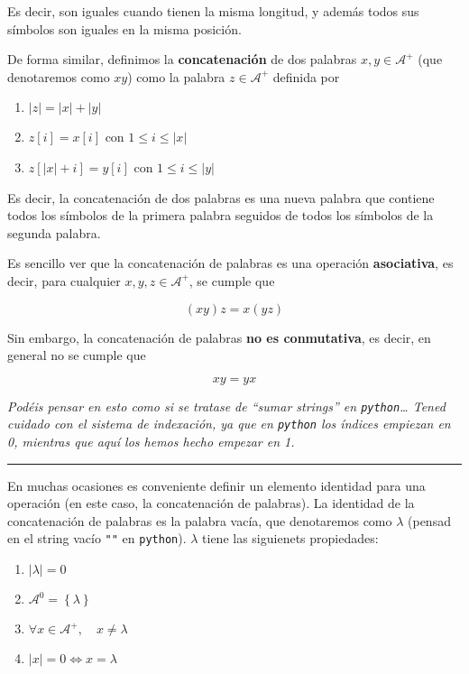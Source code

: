 Es decir, son iguales cuando tienen la misma longitud, y además todos
sus símbolos son iguales en la misma posición.

De forma similar, definimos la \textbf{concatenación} de dos palabras
\(x,y\in\mathcal{A}^+\) (que denotaremos como \(xy\)) como la palabra
\(z\in\mathcal{A}^+\) definida por

\begin{enumerate}
\def\labelenumi{\arabic{enumi}.}
\tightlist
\item
  \(|z| = |x| + |y|\)
\item
  \(z[i] = x[i]\) con \(1\leq i\leq|x|\)
\item
  \(z[|x|+i] = y[i]\) con \(1\leq i\leq |y|\)
\end{enumerate}

Es decir, la concatenación de dos palabras es una nueva palabra que
contiene todos los símbolos de la primera palabra seguidos de todos los
símbolos de la segunda palabra.

Es sencillo ver que la concatenación de palabras es una operación
\textbf{asociativa}, es decir, para cualquier \(x,y,z\in\mathcal{A}^+\),
se cumple que

\[
(x y) z = x (y z)
\]

Sin embargo, la concatenación de palabras \textbf{no es conmutativa}, es
decir, en general no se cumple que

\[
xy = yx
\]

\emph{Podéis pensar en esto como si se tratase de ``sumar strings'' en
\texttt{python}\ldots{} Tened cuidado con el sistema de indexación, ya
que en \texttt{python} los índices empiezan en 0, mientras que aquí los
hemos hecho empezar en 1.}

\begin{center}\rule{0.5\linewidth}{0.5pt}\end{center}

En muchas ocasiones es conveniente definir un elemento identidad para
una operación (en este caso, la concatenación de palabras). La identidad
de la concatenación de palabras es la palabra vacía, que denotaremos
como \(\lambda\) (pensad en el string vacío \texttt{""} en
\texttt{python}). \(\lambda\) tiene las siguienets propiedades:

\begin{enumerate}
\def\labelenumi{\arabic{enumi}.}
\tightlist
\item
  \(|\lambda| = 0\)
\item
  \(\mathcal{A}^0 = \left\{\lambda\right\}\)
\item
  \(\forall x\in\mathcal{A}^+,\quad x\neq\lambda\)
\item
  \(|x| = 0 \Leftrightarrow x = \lambda\)
\end{enumerate}

